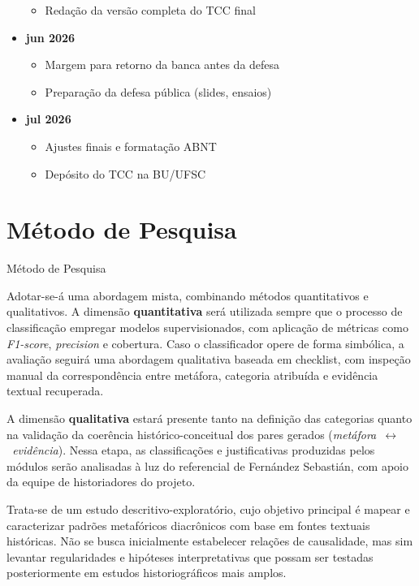 \begin{itemize}
  \begin{itemize}
  \tightlist
  \item
    Redação da versão completa do TCC final
  \end{itemize}
\item
  \textbf{jun 2026}

  \begin{itemize}
  \tightlist
  \item
    Margem para retorno da banca antes da defesa
  \item
    Preparação da defesa pública (slides, ensaios)
  \end{itemize}
\item
  \textbf{jul 2026}

  \begin{itemize}
  \tightlist
  \item
    Ajustes finais e formatação ABNT
  \item
    Depósito do TCC na BU/UFSC
  \end{itemize}
\end{itemize}

\section{\textbf{Método de
Pesquisa}}{Método de Pesquisa}\label{muxe9todo-de-pesquisa}

Adotar-se-á uma abordagem mista, combinando métodos quantitativos e
qualitativos. A dimensão \textbf{quantitativa} será utilizada sempre que
o processo de classificação empregar modelos supervisionados, com
aplicação de métricas como \emph{F1-score}, \emph{precision} e
cobertura. Caso o classificador opere de forma simbólica, a avaliação
seguirá uma abordagem qualitativa baseada em checklist, com inspeção
manual da correspondência entre metáfora, categoria atribuída e
evidência textual recuperada.

A dimensão \textbf{qualitativa} estará presente tanto na definição das
categorias quanto na validação da coerência histórico-conceitual dos
pares gerados (\emph{metáfora~$\leftrightarrow$~evidência}). Nessa etapa, as
classificações e justificativas produzidas pelos módulos serão
analisadas à luz do referencial de Fernández Sebastián, com apoio da
equipe de historiadores do projeto.

Trata-se de um estudo descritivo-exploratório, cujo objetivo principal é
mapear e caracterizar padrões metafóricos diacrônicos com base em fontes
textuais históricas. Não se busca inicialmente estabelecer relações de
causalidade, mas sim levantar regularidades e hipóteses interpretativas
que possam ser testadas posteriormente em estudos historiográficos mais
amplos.

